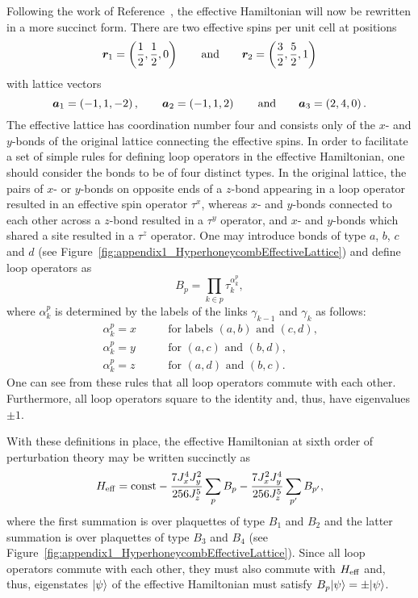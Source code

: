 Following the work of Reference~\cite{MandalPRB2014}, the effective Hamiltonian will now be rewritten in a more succinct form.
There are two effective spins per unit cell at positions
%
\begin{equation}
	\bm{r}_1 = \left( \frac{1}{2}, \frac{1}{2}, 0 \right) \qquad{\rm and}\qquad \bm{r}_2 = \left( \frac{3}{2}, \frac{5}{2}, 1 \right)
\end{equation}
%
with lattice vectors
%
\begin{equation}
	\bm{a}_1 = \left( -1, 1, -2 \right), \qquad \bm{a}_2 = \left( -1, 1, 2 \right) \qquad{\rm and}\qquad \bm{a}_3 = \left( 2, 4, 0 \right).
\end{equation}
%
The effective lattice has coordination number four and consists only of the $x$- and $y$-bonds of the original lattice connecting the effective spins.
In order to facilitate a set of simple rules for defining loop operators in the effective Hamiltonian, one should consider the bonds to be of four distinct types.
In the original lattice, the pairs of $x$- or $y$-bonds on opposite ends of a $z$-bond appearing in a loop operator resulted in an effective spin operator $\tau^x$, whereas $x$- and $y$-bonds connected to each other across a $z$-bond resulted in a $\tau^y$ operator, and $x$- and $y$-bonds which shared a site resulted in a $\tau^z$ operator.
One may introduce bonds of type $a$, $b$, $c$ and $d$ (see Figure~\ref{fig:appendix1_HyperhoneycombEffectiveLattice}) and define loop operators as
%
\begin{equation}
	B_p = \prod_{k \in p} \tau_k^{\alpha^p_k},
\end{equation}
%
where $\alpha^p_k$ is determined by the labels of the links $\gamma_{k-1}$ and $\gamma_k$ as follows:
%
\begin{align}
	\alpha^p_k = x \qquad &\text{for labels $(a,b)$ and $(c,d)$,} \nonumber\\
	\alpha^p_k = y \qquad &\text{for $(a,c)$ and $(b,d)$,} \nonumber\\
	\alpha^p_k = z \qquad &\text{for $(a,d)$ and $(b,c)$.}
	\label{eq:appendix1_LoopRules}
\end{align}
%
One can see from these rules that all loop operators commute with each other.
Furthermore, all loop operators square to the identity and, thus, have eigenvalues $\pm 1$.

With these definitions in place, the effective Hamiltonian at sixth order of perturbation theory may be written succinctly as
%
\begin{equation}
	H_{\rm eff} = {\rm const} - \frac{7 J_x^4 J_y^2}{256 J_z^5} \sum_{p} B_p - \frac{7 J_x^2 J_y^4}{256 J_z^5} \sum_{p'} B_{p'},
	\label{eq:10_3b_Heff}
\end{equation}
%
where the first summation is over plaquettes of type $B_1$ and $B_2$ and the latter summation is over plaquettes of type $B_3$ and $B_4$ (see Figure~\ref{fig:appendix1_HyperhoneycombEffectiveLattice}).
Since all loop operators commute with each other, they must also commute with $H_{\rm eff}$ and, thus, eigenstates $| \psi \rangle$ of the effective Hamiltonian must satisfy $B_p | \psi \rangle = \pm | \psi \rangle$.


